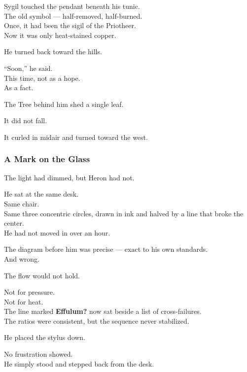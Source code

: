 \documentclass[12pt]{article}
\begin{document}
\vspace{1em}

Sygil touched the pendant beneath his tunic.\\
The old symbol — half-removed, half-burned.\\
Once, it had been the sigil of the Priotheer.\\
Now it was only heat-stained copper.

He turned back toward the hills.

“Soon,” he said.\\
This time, not as a hope.\\
As a fact.

\vspace{1em}

The Tree behind him shed a single leaf.

It did not fall.

It curled in midair and turned toward the west.

\dotfill

\subsubsection*{A Mark on the Glass}

The light had dimmed, but Heron had not.

He sat at the same desk.\\
Same chair.\\
Same three concentric circles, drawn in ink and halved by a line that broke the center.\\
He had not moved in over an hour.

The diagram before him was precise — exact to his own standards.\\
And wrong.

\vspace{1em}

The flow would not hold.

Not for pressure.\\
Not for heat.\\
The line marked \textbf{Effulum?} now sat beside a list of cross-failures.\\
The ratios were consistent, but the sequence never stabilized.

\vspace{1em}

He placed the stylus down.

No frustration showed.\\
He simply stood and stepped back from the desk.
\end{document}
